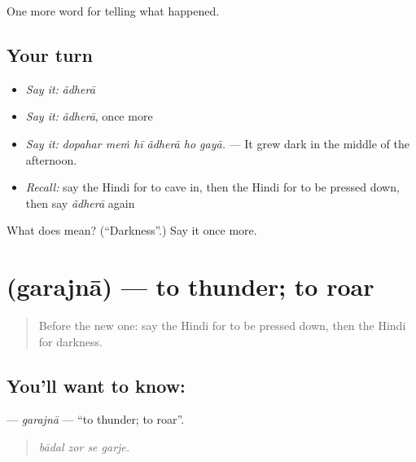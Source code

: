 \begin{grammarlens}[title={What you've built}]
One more word for telling what happened.
\end{grammarlens}

\subsection*{Your turn}
\begin{itemize}
\raggedright
  \item \emph{Say it:} \emph{ãdherā}
  \item \emph{Say it:} \emph{ãdherā}, once more
  \item \emph{Say it:} \emph{dopahar meṁ hī ãdherā ho gayā.} — It grew dark in the middle of the afternoon.
  \item \emph{Recall:} say the Hindi for to cave in, then the Hindi for to be pressed down, then say \emph{ãdherā} again
\end{itemize}

\begin{tcolorbox}[breakable,colback=teal!4,colframe=teal!35!black,title={Before you move on}]
What does  mean? (\textquotedblleft{}Darkness\textquotedblright{}.) Say it once more.
\end{tcolorbox}
\section[\texorpdfstring{\hi{गरजना} (garajnā)}{गरजना (garajnā)}]{ (garajnā) — to thunder; to roar}

\label{lesson:HI-C304-garajna}



\begin{quote}
Before the new one: say the Hindi for to be pressed down, then the Hindi for darkness.
\end{quote}

\subsection*{You'll want to know: }
\textbf{} — \emph{garajnā} — \textquotedblleft{}to thunder; to roar\textquotedblright{}.

\begin{quote}
   
\end{quote}

\begin{quote}
\emph{bādal zor se garje.}
\end{quote}

